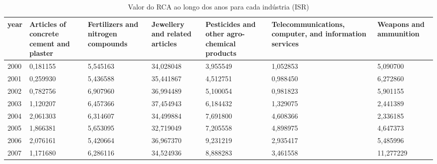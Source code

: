 \begin{table}
\centering
\caption{Valor do RCA ao longo dos anos para cada indústria (ISR)}
\begin{tabular}{p{1cm}p{2cm}p{2cm}p{2cm}p{2cm}p{2cm}p{2cm}}
\toprule
 year &  Articles of concrete cement and plaster &  Fertilizers and nitrogen compounds &  Jewellery and related articles &  Pesticides and other agro-chemical products &  Telecommunications, computer, and information services &  Weapons and ammunition \\
\midrule
 2000 &                                 0,181155 &                            5,545163 &                       34,028048 &                                     3,955549 &                                           1,052853 &                5,090700 \\
 2001 &                                 0,259930 &                            5,436588 &                       35,441867 &                                     4,512751 &                                           0,988450 &                6,272860 \\
 2002 &                                 0,782756 &                            6,907960 &                       36,994489 &                                     5,100054 &                                           0,981823 &                5,901155 \\
 2003 &                                 1,120207 &                            6,457366 &                       37,454943 &                                     6,184432 &                                           1,329075 &                2,441389 \\
 2004 &                                 2,061303 &                            6,314607 &                       34,499884 &                                     7,691800 &                                           4,608366 &                2,336185 \\
 2005 &                                 1,866381 &                            5,653095 &                       32,719049 &                                     7,205558 &                                           4,898975 &                4,647373 \\
 2006 &                                 2,076161 &                            5,420664 &                       36,967370 &                                     9,231219 &                                           2,935417 &                5,485996 \\
 2007 &                                 1,171680 &                            6,286116 &                       34,524936 &                                     8,888283 &                                           3,461558 &               11,277229 \\

\end{tabular}
\end{table}
